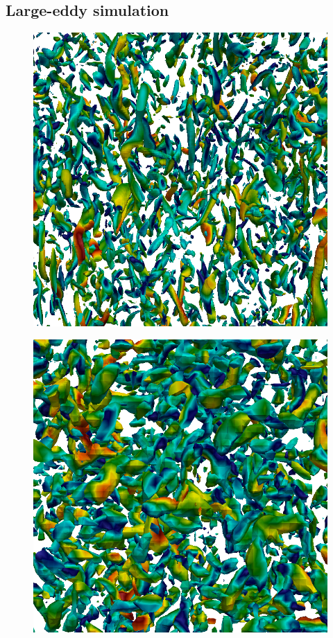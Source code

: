 \documentclass[11pt,a4paper,openany,oneside,parskip=half*]{article}
\begin{document}
\subsection{Large-eddy simulation}
\begin{figure}[h]
    \centering
    \begin{minipage}[t]{.5\textwidth}
        \centering
        \includegraphics[width=0.95\linewidth]{./Abbildungen/256_velocity_4.png}
        \label{256_velocity}
    \end{minipage}%
    \begin{minipage}[t]{0.5\textwidth}
        \centering
        \includegraphics[width=0.95\linewidth]{./Abbildungen/64_velocity.png}

\end{minipage}
\end{figure}
\end{document}
